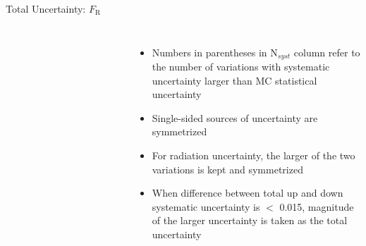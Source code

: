\documentclass{beamer}
\newcommand*{\fr}{\ensuremath{F_{\text{R}}}\xspace}
\begin{document}
{\begin{frame}{Total Uncertainty: \fr}
\begin{columns}
\begin{table}[h!]
\begin{tabular}{lcccc}
          \hline\hline
        \end{tabular}
      \end{table}
      \begin{itemize}\footnotesize
        \item Numbers in parentheses in N$_{syst}$ column refer to the number of variations with systematic uncertainty larger than MC statistical uncertainty
        \item Single-sided sources of uncertainty are symmetrized
        \item For radiation uncertainty, the larger of the two variations is kept and symmetrized
        \item  When difference between total up and down systematic uncertainty is $<$ 0.015, magnitude of the larger uncertainty is taken as the total uncertainty
      \end{itemize}
    \end{columns}
    
  \end{frame}


}
\end{document}
